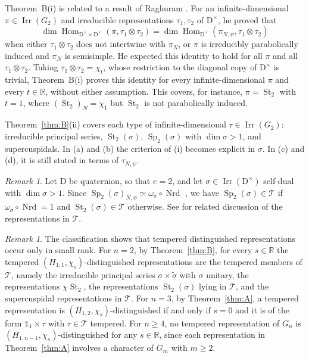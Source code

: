 \documentclass[11pt]{amsart}
\numberwithin{equation}{section}
\theoremstyle{plain}
\theoremstyle{definition}
\theoremstyle{remark}
\newtheorem{remark}[theorem]{Remark}
\newcommand{\R}{\mathbb{R}}
\newcommand{\one}{\mathds{1}}
\newcommand{\T}{\mathcal{T}}
\DeclareMathOperator{\Hom}{Hom}
\DeclareMathOperator{\Irr}{Irr}
\DeclareMathOperator{\Nrd}{Nrd}
\DeclareMathOperator{\St}{St}
\DeclareMathOperator{\Sp}{Sp}
\begin{document}
Theorem~B\textup{(i)} is related to a result of Raghuram \cite[Theorem~1.1]{Rag07}. For an infinite-dimensional $\pi\in\Irr(G_2)$ and irreducible representations $\tau_1,\tau_2$ of $\mathrm{D}^\times$, he proved that
$$\dim\Hom_{\mathrm{D}^\times\times\mathrm{D}^\times}(\pi,\tau_1\otimes\tau_2)=\dim\Hom_{\mathrm{D}^\times}(\pi_{N,\psi},\tau_1\otimes\tau_2)$$
when either $\tau_1\otimes\tau_2$ does not intertwine with $\pi_N$, or $\pi$ is irreducibly parabolically induced and $\pi_N$ is semisimple. He expected this identity to hold for all $\pi$ and all $\tau_1\otimes\tau_2$. Taking $\tau_1\otimes\tau_2=\chi_t$, whose restriction to the diagonal copy of $\mathrm{D}^\times$ is trivial, Theorem~B\textup{(i)} proves this identity for every infinite-dimensional $\pi$ and every $t\in\R$, without either assumption. This covers, for instance, $\pi=\St_2$ with $t=1$, where $(\St_2)_N=\chi_1$ but $\St_2$ is not parabolically induced.

Theorem~\ref{thm:B}\textup{(ii)} covers each type of infinite-dimensional $\tau\in\Irr(G_2)$: irreducible principal series, $\St_2(\sigma)$, $\Sp_2(\sigma)$ with $\dim\sigma>1$, and supercuspidals. In \textup{(a)} and \textup{(b)} the criterion of \textup{(i)} becomes explicit in $\sigma$. In \textup{(c)} and \textup{(d)},  it is still stated in terms of $\tau_{N,\psi}$.

\begin{remark}\label{rem:quaternion-dichotomy}
	Let $\mathrm{D}$ be quaternion, so that $e=2$,  and  let $\sigma\in\Irr(\mathrm{D}^\times)$ self-dual with $\dim\sigma>1$. Since $\Sp_2(\sigma)_{N,\psi}\simeq\omega_\sigma\circ\Nrd$ \cite[Theorem~1.1]{NS25}, we have  $\Sp_2(\sigma)\in\T$ if $\omega_\sigma\circ\Nrd=1$ and $\St_2(\sigma)\in\T$ otherwise. See \cite{Rag07,GT10,Pra01} for related discussion of the representations in $\T$.
\end{remark}

\begin{remark}\label{rem:tempered}
	The classification shows that tempered distinguished representations occur only in small rank. For $n=2$, by Theorem~\ref{thm:B}, for every $s\in\R$ the tempered $(H_{1,1},\chi_s)$-distinguished representations are the tempered members of $\T$, namely the irreducible principal series $\sigma\times\widetilde\sigma$ with $\sigma$ unitary, the representations $\chi\St_2$, the representations $\St_2(\sigma)$ lying in $\T$, and the supercuspidal representations in $\T$. For $n=3$, by Theorem~\ref{thm:A}, a tempered representation is $(H_{1,2},\chi_s)$-distinguished if and only if $s=0$ and it is of the form $\one_1\times\tau$ with $\tau\in\T$ tempered. For $n\ge4$, no tempered representation of $G_n$ is $(H_{1,n-1},\chi_s)$-distinguished for any $s\in\R$, since each representation in Theorem~\ref{thm:A} involves a character of $G_m$ with $m\ge2$.
\end{remark}
\end{document}
